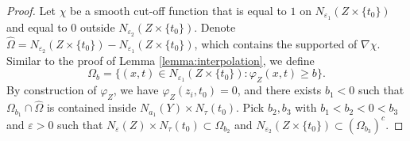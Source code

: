 \documentclass[10pt,a4paper]{amsart}
\begin{document}
\begin{proof}
	Let $\chi$ be a smooth cut-off function that is equal to $1$ on $N_{\varepsilon_1}(Z\times\{t_0\})$ and equal to $0$ outside $N_{\varepsilon_2}(Z\times\{t_0\})$. Denote $\widehat\Omega=N_{\varepsilon_2}(Z\times\{t_0\})-N_{\varepsilon_1}(Z\times\{t_0\})$, which contains the supported of $\nabla\chi$.
	Similar to the proof of Lemma \ref{lemma:interpolation}, we define
	$$\Omega_b=\{(x,t)\in N_{\varepsilon_1}(Z\times\{t_0\}):\varphi_Z(x,t)\geq b\}.$$
	By construction of $\varphi_Z$, we have $\varphi_Z(z_i,t_0)=0$, and there exists $b_1<0$ such that $\Omega_{b_1}\cap\widehat\Omega$ is contained inside $N_{a_1}(Y)\times N_\tau(t_0)$. Pick $b_2,b_3$ with $b_1<b_2<0<b_3$ and $\varepsilon>0$ such that $N_\varepsilon(Z)\times N_\tau(t_0)\subset \Omega_{b_2}$ and $N_{\varepsilon_2}(Z\times\{t_0\})\subset (\Omega_{b_3})^c$. 
	

\end{proof}
\end{document}
